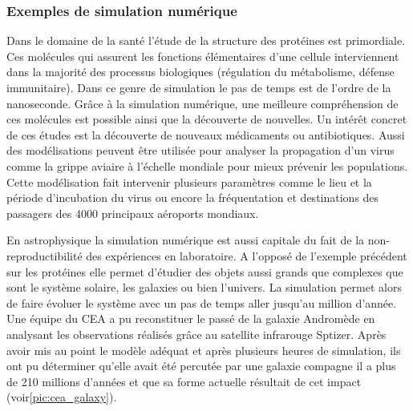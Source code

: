 


    \subsubsection{Exemples de simulation numérique}
    
        Dans le domaine de la santé l'étude de la structure des protéines est primordiale.  Ces molécules qui assurent les fonctions élémentaires d'une cellule interviennent dans la majorité des processus biologiques (régulation du métabolisme, défense immunitaire). Dans ce genre de simulation le pas de temps est de l'ordre de la nanoseconde. Grâce à la simulation numérique, une meilleure compréhension de ces molécules est possible ainsi que la découverte de nouvelles. Un intérêt concret de ces études est la découverte de nouveaux médicaments ou antibiotiques. 
        Aussi des modélisations peuvent être utilisée pour analyser la propagation d'un virus comme la grippe aviaire à l'échelle mondiale pour mieux prévenir les populations\cite{CEA2007}. Cette modélisation fait intervenir plusieurs paramètres comme le lieu et la période d'incubation du virus ou encore la fréquentation et destinations des passagers des 4000 principaux aéroports mondiaux.
        
        En astrophysique la simulation numérique est aussi capitale du fait de la non-reproductibilité des expériences en laboratoire.  A l'opposé de l'exemple précédent sur les protéines elle permet d'étudier des objets aussi grands que complexes que sont le système solaire, les galaxies ou bien l'univers. La simulation permet alors de faire évoluer le système avec un pas de temps aller jusqu'au million d'année. Une équipe du CEA a pu reconstituer le passé de la galaxie Andromède en analysant les observations réalisés grâce au satellite infrarouge Sptizer\cite{Block2006a}. Après avoir mis au point le modèle adéquat et après plusieurs heures de simulation, ils ont pu déterminer qu'elle avait été percutée par une galaxie compagne il a plus de 210 millions d'années et que sa forme actuelle résultait de cet impact (voir\autoref{pic:cea_galaxy}).
    
